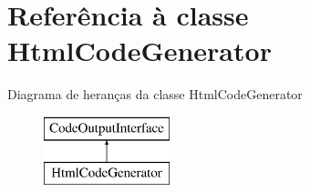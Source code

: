 \hypertarget{class_html_code_generator}{\section{Referência à classe Html\-Code\-Generator}
\label{class_html_code_generator}
}
Diagrama de heranças da classe Html\-Code\-Generator\begin{figure}[H]
\begin{center}
\leavevmode
\includegraphics[height=2.000000cm]{class_html_code_generator}
\end{center}
\end{figure}
